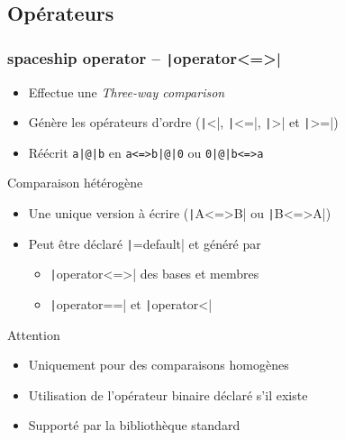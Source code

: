 \documentclass[C++.tex]{subfiles}
\begin{document}
\subsection*{Opérateurs}
\begin{frame}[fragile]
	\frametitle{spaceship operator -- \texttt|operator<=>|}
	\begin{itemize}
		\item Effectue une \og \textit{Three-way comparison}\fg{}
		\item Génère les opérateurs d'ordre (\texttt|<|, \texttt|<=|, \texttt|>| et \texttt|>=|)
		\item Réécrit \texttt{a|@|b} en \texttt{a<=>b|@|0} ou \texttt{0|@|b<=>a}
	\end{itemize}

	\begin{exampleblock}{Comparaison hétérogène}
		\begin{itemize}
			\item Une unique version à écrire (\texttt|A<=>B| ou \texttt|B<=>A|)
		\end{itemize}
	\end{exampleblock}

	\begin{itemize}
		\item Peut être déclaré \texttt|=default| et généré par
		\begin{itemize}
			\item \texttt|operator<=>| des bases et membres
			\item \texttt|operator==| et \texttt|operator<|
		\end{itemize}
	\end{itemize}

	\begin{alertblock}{Attention}
		\begin{itemize}
			\item Uniquement pour des comparaisons homogènes
		\end{itemize}
	\end{alertblock}

	\begin{itemize}
		\item Utilisation de l'opérateur binaire déclaré s'il existe
		\item Supporté par la bibliothèque standard
	\end{itemize}

\end{frame}
\end{document}
